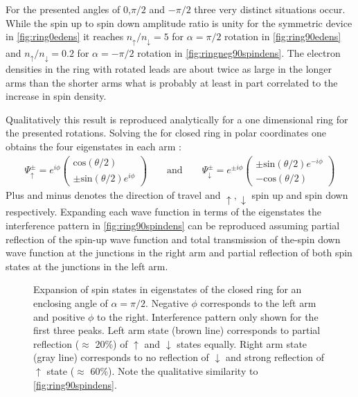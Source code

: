 For the presented angles of 0,$\pi/2$ and $-\pi/2$ three very distinct situations occur. While the spin up to spin down amplitude ratio is unity for the symmetric device in \cref{fig:ring0edens} it reaches $n_{\uparrow}/n_{\downarrow}=5$ for $\alpha=\pi/2$ rotation in \cref{fig:ring90edens} and $n_{\uparrow}/n_{\downarrow}=0.2$ for $\alpha=-\pi/2$ rotation in \cref{fig:ringneg90spindens}. The electron densities in the ring with rotated leads are about twice as large in the longer arms than the shorter arms what is probably at least in part correlated to the increase in spin density.\par
Qualitatively this result is reproduced analytically for a one dimensional ring for the presented rotations. Solving the \hamil{} for closed ring in polar coordinates one obtains the four eigenstates in each arm \cite{nitta1999.695}:
\begin{align}
  \Psi^{\pm}_{\uparrow} = e^{i\phi}\begin{pmatrix}\text{cos}(\theta/2)\\\pm\text{sin}(\theta/2)e^{i\phi}\end{pmatrix} 
  \qquad\text{and}\qquad
  \Psi^{\pm}_{\downarrow} = e^{\pm i\phi}\begin{pmatrix}\pm\text{sin}(\theta/2)e^{-i\phi}\\-\text{cos}(\theta/2)\end{pmatrix}
\end{align}
Plus and minus denotes the direction of travel and $\uparrow,\downarrow$ spin up and spin down respectively. Expanding each wave function in terms of the eigenstates the interference pattern in \cref{fig:ring90spindens} can be reproduced assuming partial reflection of the spin-up wave function and total transmission of the-spin down wave function at the junctions in the right arm and partial reflection of both spin states at the junctions in the left arm.
\begin{figure}[!h]
  \centering
  \caption{Expansion of spin states in eigenstates of the closed ring for an enclosing angle of $\alpha = \pi/2$. Negative $\phi$ corresponds to the left arm and positive $\phi$ to the right. Interference pattern only shown for the first three peaks. Left arm state (brown line) corresponds to partial reflection ($\approx$ 20\%) of $\uparrow$ and $\downarrow$ states equally. Right arm state (gray line) corresponds to no reflection of $\downarrow$ and strong reflection of $\uparrow$ state ($\approx$ 60\%). Note the qualitative similarity to \cref{fig:ring90spindens}.}
\end{figure}
